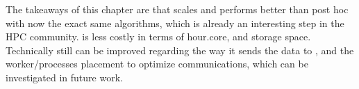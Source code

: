 The takeaways of this chapter are that \deisa scales and performs better than post hoc with now the exact same algorithms, which is already an interesting step in the HPC community. \deisa is less costly in terms of hour.core, and storage space. Technically \deisa still can be improved regarding the way it sends the data to \dask, and the worker/processes placement to optimize communications, which can be investigated in future work.  

